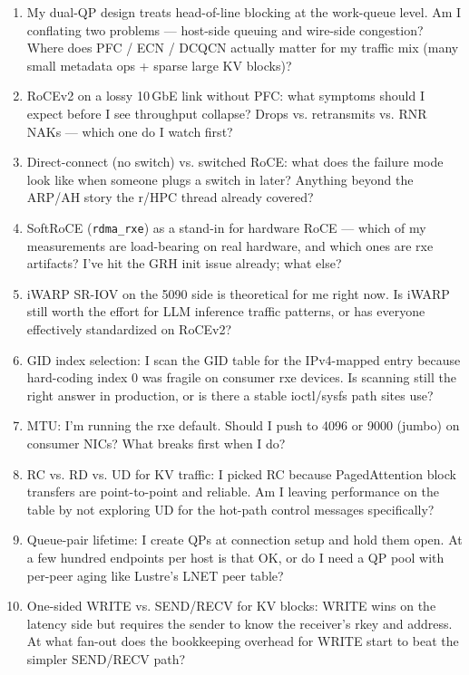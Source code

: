 \documentclass[11pt]{article}
\begin{document}
\begin{enumerate}
\item My dual-QP design treats head-of-line blocking at the work-queue
level. Am I conflating two problems --- host-side queuing and
wire-side congestion? Where does PFC / ECN / DCQCN actually matter for
my traffic mix (many small metadata ops + sparse large KV blocks)?

\item RoCEv2 on a lossy 10\,GbE link without PFC: what symptoms should
I expect before I see throughput collapse? Drops vs. retransmits vs.
RNR NAKs --- which one do I watch first?

\item Direct-connect (no switch) vs. switched RoCE: what does the
failure mode look like when someone plugs a switch in later? Anything
beyond the ARP/AH story the r/HPC thread already covered?

\item SoftRoCE (\texttt{rdma\_rxe}) as a stand-in for hardware RoCE ---
which of my measurements are load-bearing on real hardware, and which
ones are rxe artifacts? I've hit the GRH init issue already; what
else?

\item iWARP SR-IOV on the 5090 side is theoretical for me right now.
Is iWARP still worth the effort for LLM inference traffic patterns, or
has everyone effectively standardized on RoCEv2?

\item GID index selection: I scan the GID table for the
IPv4-mapped entry because hard-coding index 0 was fragile on
consumer rxe devices. Is scanning still the right answer in
production, or is there a stable ioctl/sysfs path sites use?

\item MTU: I'm running the rxe default. Should I push to 4096 or 9000
(jumbo) on consumer NICs? What breaks first when I do?

\item RC vs. RD vs. UD for KV traffic: I picked RC because PagedAttention
block transfers are point-to-point and reliable. Am I leaving
performance on the table by not exploring UD for the hot-path control
messages specifically?

\item Queue-pair lifetime: I create QPs at connection setup and hold
them open. At a few hundred endpoints per host is that OK, or do I
need a QP pool with per-peer aging like Lustre's LNET peer table?

\item One-sided WRITE vs. SEND/RECV for KV blocks: WRITE wins on the
latency side but requires the sender to know the receiver's rkey and
address. At what fan-out does the bookkeeping overhead for WRITE start
to beat the simpler SEND/RECV path?
\end{enumerate}
\end{document}
